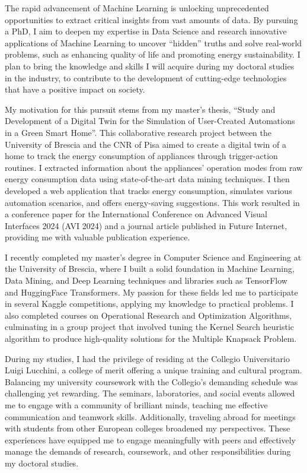 
The rapid advancement of Machine Learning is unlocking unprecedented opportunities to extract critical insights from vast amounts of data. By pursuing a PhD, I aim to deepen my expertise in Data Science and research innovative applications of Machine Learning to uncover ``hidden'' truths and solve real-world problems, such as enhancing quality of life and promoting energy sustainability. I plan to bring the knowledge and skills I will acquire during my doctoral studies in the industry, to contribute to the development of cutting-edge technologies that have a positive impact on society.

My motivation for this pursuit stems from my master's thesis, ``Study and Development of a Digital Twin for the Simulation of User-Created Automations in a Green Smart Home''. This collaborative research project between the University of Brescia and the CNR of Pisa aimed to create a digital twin of a home to track the energy consumption of appliances through trigger-action routines. I extracted information about the appliances' operation modes from raw energy consumption data using state-of-the-art data mining techniques. I then developed a web application that tracks energy consumption, simulates various automation scenarios, and offers energy-saving suggestions. This work resulted in a conference paper for the International Conference on Advanced Visual Interfaces 2024 (AVI 2024) and a journal article published in Future Internet, providing me with valuable publication experience.

I recently completed my master's degree in Computer Science and Engineering at the University of Brescia, where I built a solid foundation in Machine Learning, Data Mining, and Deep Learning techniques and libraries such as TensorFlow and HuggingFace Transformers. My passion for these fields led me to participate in several Kaggle competitions, applying my knowledge to practical problems. I also completed courses on Operational Research and Optimization Algorithms, culminating in a group project that involved tuning the Kernel Search heuristic algorithm to produce high-quality solutions for the Multiple Knapsack Problem.

During my studies, I had the privilege of residing at the Collegio Universitario Luigi Lucchini, a college of merit offering a unique training and cultural program. Balancing my university coursework with the Collegio's demanding schedule was challenging yet rewarding. The seminars, laboratories, and social events allowed me to engage with a community of brilliant minds, teaching me effective communication and teamwork skills. Additionally, traveling abroad for meetings with students from other European colleges broadened my perspectives. These experiences have equipped me to engage meaningfully with peers and effectively manage the demands of research, coursework, and other responsibilities during my doctoral studies.

